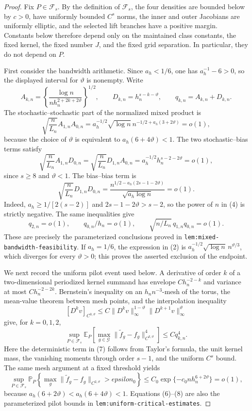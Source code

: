 \documentclass{article}
\begin{document}
\begin{proof}
Fix \(P\in\mathcal F_s\).  By the definition of \(\mathcal F_s\), the four densities are bounded below by \(c>0\), have uniformly bounded \(C^s\) norms, the inner and outer Jacobians are uniformly elliptic, and the selected lift branches have a positive margin.  Constants below therefore depend only on the maintained class constants, the fixed kernel, the fixed number \(J\), and the fixed grid separation.  In particular, they do not depend on \(P\).

First consider the bandwidth arithmetic.  Since \(a_h<1/6\), one has \(a_h^{-1}-6>0\), so the displayed interval for \(\vartheta\) is nonempty.  Write
\[
 A_{k,n}=\left\{\frac{\log n}
 {n h_n^{2+2k+2\vartheta}}\right\}^{1/2},
 \qquad
 D_{k,n}=h_n^{s-k-\vartheta},
 \qquad q_{k,n}=A_{k,n}+D_{k,n}.
\tag{1}
\]
The stochastic--stochastic part of the normalized mixed product is
\[
 \sqrt{\frac n{L_n}}A_{1,n}A_{0,n}
 =a_h^{-1/2}\sqrt{\log n}\,
 n^{-1/2+a_h(3+2\vartheta)}=o(1),
\tag{2}
\]
because the choice of \(\vartheta\) is equivalent to
\(a_h(6+4\vartheta)<1\).  The two stochastic--bias terms satisfy
\[
 \sqrt{\frac n{L_n}}A_{1,n}D_{0,n}
 =\sqrt{\frac n{L_n}}D_{1,n}A_{0,n}
 =a_h^{-1/2}h_n^{s-2-2\vartheta}=o(1),
\tag{3}
\]
since \(s\geq8\) and \(\vartheta<1\).  The bias--bias term is
\[
 \sqrt{\frac n{L_n}}D_{1,n}D_{0,n}
 =\frac{n^{1/2-a_h(2s-1-2\vartheta)}}{\sqrt{a_h\log n}}=o(1).
\tag{4}
\]
Indeed, \(a_h\geq1/[2(s-2)]\) and
\(2s-1-2\vartheta>s-2\), so the power of \(n\) in (4) is strictly negative.  The same inequalities give
\[
 q_{2,n}=o(1),\qquad q_{0,n}/h_n=o(1),
 \qquad \sqrt{n/L_n}\,q_{1,n}q_{0,n}=o(1).
\tag{5}
\]
These are precisely the parameterized conclusions proved in
\texttt{lem:mixed-bandwidth-feasibility}.  If \(a_h=1/6\), the expression in (2) is
\(a_h^{-1/2}\sqrt{\log n}\,n^{\vartheta/3}\), which diverges for every \(\vartheta>0\); this proves the asserted exclusion of the endpoint.

We next record the uniform pilot event used below.  A derivative of order \(k\) of a two-dimensional periodized kernel summand has envelope \(Ch_n^{-2-k}\) and variance at most \(Ch_n^{-2-2k}\).  Bernstein's inequality on an \(h_n n^{-3}\)-mesh of the torus, the mean-value theorem between mesh points, and the interpolation inequality
\[
 [D^k v]_{C^{0,\vartheta}}
 \leq C\lVert D^k v\rVert_\infty^{1-\vartheta}
          \lVert D^{k+1}v\rVert_\infty^\vartheta
\tag{6}
\]
give, for \(k=0,1,2\),
\[
 \sup_{P\in\mathcal F_s}\mathbb E_P\!\left[
 \max_{g\in\mathcal G}
 \lVert\widetilde f_g-f_g\rVert_{C^{k,\vartheta}}^4\right]
 \leq Cq_{k,n}^4.
\tag{7}
\]
Here the deterministic term in (7) follows from Taylor's formula, the unit kernel mass, the vanishing moments through order \(s-1\), and the uniform \(C^s\) bound.  The same mesh argument at a fixed threshold yields
\[
 \sup_{P\in\mathcal F_s}\mathbb P_P\!\left\{
 \max_g\lVert\widetilde f_g-f_g\rVert_{C^{2,\vartheta}}>epsilon_0
 \right\}
 \leq C_0\exp\{-c_0nh_n^{6+2\vartheta}\}=o(1),
\tag{8}
\]
because \(a_h(6+2\vartheta)<a_h(6+4\vartheta)<1\).  Equations (6)--(8) are also the parameterized pilot bounds in
\texttt{lem:uniform-critical-estimates}.


\end{proof}
\end{document}
